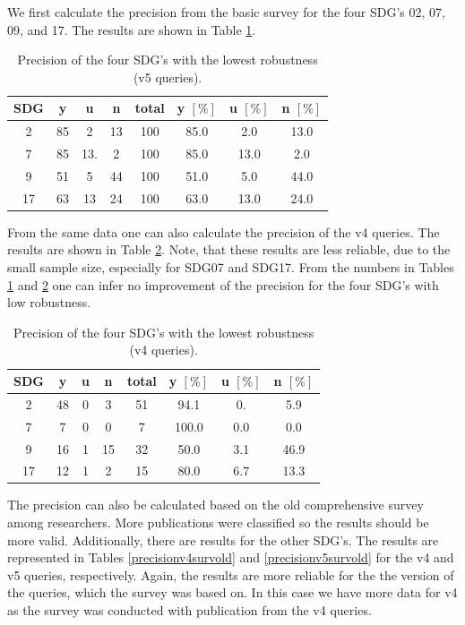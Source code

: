 \documentclass{article}
\begin{document}
We first calculate the precision from the basic survey for the four SDG's 02, 07, 09, and 17. The results are shown in Table \ref{precisionv5surv}.
\begin{table}[H]
\centering 
 \begin{tabular}{cccccccc}
 \toprule
 SDG & y & u & n & total & y $[\%]$ & u $[\%]$ & n $[\%]$ \\
  \hline
2 & 85 & 2 & 13 & 100 & 85.0 & 2.0 & 13.0 \\
7 & 85 & 13. & 2 & 100 & 85.0 & 13.0 & 2.0 \\
9 & 51 & 5 & 44 & 100 & 51.0 & 5.0 & 44.0 \\
17 & 63 & 13 & 24 & 100 & 63.0& 13.0 & 24.0 \\
\bottomrule
\end{tabular}
\caption{Precision of the four SDG's with the lowest robustness (v5 queries).}\label{precisionv5surv}
\end{table}
From the same data one can also calculate the precision of the v4 queries. The results are shown in Table \ref{precisionv4surv}. Note, that these results are less reliable, due to the small sample size, especially for SDG07 and SDG17. 
From the numbers in Tables \ref{precisionv5surv} and \ref{precisionv4surv} one can infer no improvement of the precision for the four SDG's with low robustness.
\begin{table}[H]
\centering 
 \begin{tabular}{cccccccc}
 \toprule
  SDG & y & u & n & total & y $[\%]$ & u $[\%]$ & n $[\%]$ \\
  \hline
2& 48 & 0 & 3 & 51 & 94.1 & 0. & 5.9 \\
7 & 7 & 0 & 0 & 7 & 100.0 & 0.0 & 0.0 \\
9 & 16 & 1 & 15 & 32 & 50.0 & 3.1 & 46.9 \\
17 & 12 & 1 & 2 & 15 & 80.0 & 6.7 & 13.3 \\
\bottomrule
\end{tabular}\caption{Precision of the four SDG's with the lowest robustness (v4 queries).}\label{precisionv4surv}
\end{table}
The precision can also be calculated based on the old comprehensive survey among researchers. More publications were classified so the results should be more valid. Additionally, there are results for the other SDG's. The results are represented in Tables  \ref{precisionv4survold} and \ref{precisionv5survold} for the v4 and v5 queries, respectively. Again, the results are more reliable for the the version of the queries, which the survey was based on. In this case we have more data for v4 as the survey was conducted with publication from the v4 queries.
\end{document}
